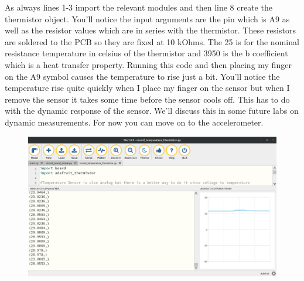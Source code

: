 {\begin{figure}[H]
\end{figure}
As always lines 1-3 import the relevant modules and then line 8 create
the thermistor object. You’ll notice the input arguments are the pin
which is A9 as well as the resistor values which are in series with
the thermistor. These resistors are soldered to the PCB so they are
fixed at 10 kOhms. The 25 is for the nominal resistance temperature in
celsius of the thermistor and 3950 is the b coefficient which is a
heat transfer property. Running this code and then placing my finger
on the A9 symbol causes the temperature to rise just a bit. You’ll
notice the temperature rise quite quickly when I place my finger on
the sensor but when I remove the sensor it takes some time before the
sensor cools off. This has to do with the dynamic response of the
sensor. We’ll discuss this in some future labs on dynamic
measurements. For now you can move on to the accelerometer. 
\begin{figure}[H]
  \begin{center}
    \includegraphics[width=\textwidth]{Figures/thermistor_mu.png}
  \end{center}
\end{figure}
}
